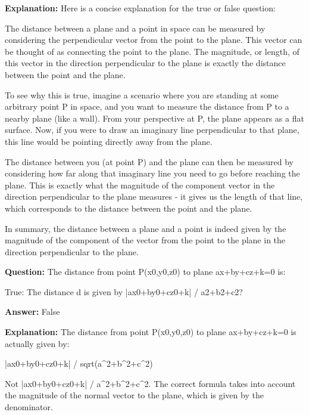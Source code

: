 \documentclass{article}
\begin{document}
                \textbf{Explanation:} Here is a concise explanation for the true or false question:

The distance between a plane and a point in space can be measured by considering the perpendicular vector from the point to the plane. This vector can be thought of as connecting the point to the plane. The magnitude, or length, of this vector in the direction perpendicular to the plane is exactly the distance between the point and the plane.

To see why this is true, imagine a scenario where you are standing at some arbitrary point P in space, and you want to measure the distance from P to a nearby plane (like a wall). From your perspective at P, the plane appears as a flat surface. Now, if you were to draw an imaginary line perpendicular to that plane, this line would be pointing directly away from the plane.

The distance between you (at point P) and the plane can then be measured by considering how far along that imaginary line you need to go before reaching the plane. This is exactly what the magnitude of the component vector in the direction perpendicular to the plane measures - it gives us the length of that line, which corresponds to the distance between the point and the plane.

In summary, the distance between a plane and a point is indeed given by the magnitude of the component of the vector from the point to the plane in the direction perpendicular to the plane.
                
                \vspace{0.5cm} 
        
            
                \textbf {Question:} The distance from point P(x0,y0,z0) to plane ax+by+cz+k=0 is:

True: The distance d is given by |ax0+by0+cz0+k| / a2+b2+c2?
                
                \textbf{Answer:} False

                \textbf{Explanation:} The distance from point P(x0,y0,z0) to plane ax+by+cz+k=0 is actually given by:

|ax0+by0+cz0+k| / sqrt(a{\textasciicircum}2+b{\textasciicircum}2+c{\textasciicircum}2)

Not |ax0+by0+cz0+k| / a{\textasciicircum}2+b{\textasciicircum}2+c{\textasciicircum}2. The correct formula takes into account the magnitude of the normal vector to the plane, which is given by the denominator.
                
\end{document}
